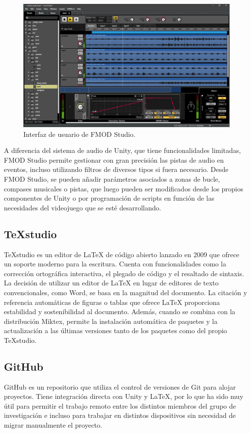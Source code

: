 \begin{figure}[h!]
	\centering
	\includegraphics[width=0.6\linewidth]{./Figuras/Aspectos/FMODStudio.jpg}
	\caption{Interfaz de usuario de FMOD Studio.}
	\label{fig:FMODUI}
\end{figure}

A diferencia del sistema de audio de Unity, que tiene funcionalidades limitadas, FMOD Studio permite gestionar con gran precisión las pistas de audio en eventos, incluso utilizando filtros de diversos tipos si fuera necesario. Desde FMOD Studio, se pueden añadir parámetros asociados a zonas de bucle, compases musicales o pistas, que luego pueden ser modificados desde los propios componentes de Unity o por programación de scripts en función de las necesidades del videojuego que se esté desarrollando.

\subsection{TeXstudio}

TeXstudio es un editor de LaTeX de código abierto lanzado en 2009 que ofrece un soporte moderno para la escritura. Cuenta con funcionalidades como la corrección ortográfica interactiva, el plegado de código y el resaltado de sintaxis. La decisión de utilizar un editor de LaTeX en lugar de editores de texto convencionales, como Word, se basa en la magnitud del documento. La citación y referencia automáticas de figuras o tablas que ofrece LaTeX proporciona estabilidad y sostenibilidad al documento. Además, cuando se combina con la distribución Miktex, permite la instalación automática de paquetes y la actualización a las últimas versiones tanto de los paquetes como del propio TeXstudio.

\subsection{GitHub}

GitHub es un repositorio que utiliza el control de versiones de Git para alojar proyectos. Tiene integración directa con Unity y LaTeX, por lo que ha sido muy útil para permitir el trabajo remoto entre los distintos miembros del grupo de investigación e incluso para trabajar en distintos dispositivos sin necesidad de migrar manualmente el proyecto.